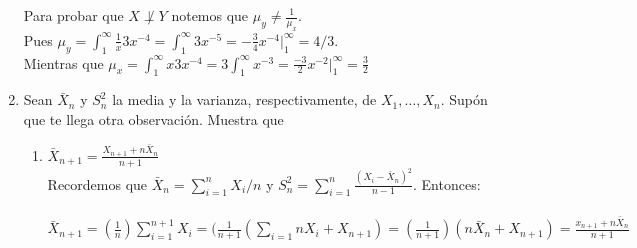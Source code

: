 \documentclass[letter]{memoir} %
\begin{document}
\begin{enumerate}
\begin{flushleft}
Para probar que $X \not\perp Y$ notemos que $\mu_y \neq \frac{1}{\mu_x}$.\\
Pues $\mu_y = \int_1^\infty \frac{1}{x} 3x^{-4} = \int_1^{\infty} 3x ^{-5} = -\frac{3}{4} x^{-4}|_1^{\infty} = 4/3$.\\
Mientras que $\mu_x = \int_1^{\infty}x3x^{-4} = 3\int_1^{\infty}{x^{-3}} = \frac{-3}{2}x^{-2}|_1^\infty = \frac{3}{2}$
\end{flushleft}


\item
Sean $\bar{X}_{n}$ y $S_n^2$  la media y la varianza, respectivamente, de $X_1,\dots,X_n$. Supón que te llega otra observación. Muestra que 
	\begin{enumerate}
		\item $\bar{X}_{n+1} = \frac{X_{n+1}+n\bar{X}_n}{n+1}$ \\
        Recordemos que $\bar{X}_n = \sum_{i=1}^nX_i/n$ y $S_n^2 = \sum_{i=1}^n \frac{(X_i-\bar{X}_n)^2}{n-1}$. Entonces:\\\\
$\bar{X}_{n+1}  = (\frac{1}{n})\sum_{i=1}^{n+1}X_i = (\frac{1}{n+1}(\sum_{i=1}{n}X_i + X_{n+1})=(\frac{1}{n+1})(n\bar{X}_n + X_{n+1}) = \frac{x_{n+1}+n \bar{X}_n}{n+1} $
\\ \\ \\


\end{enumerate}
\end{enumerate}
\end{document}
